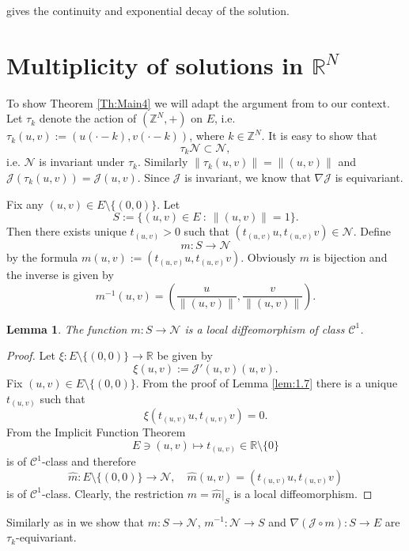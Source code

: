 \documentclass{scrartcl}
\newtheorem{Lem}[Th]{Lemma}
\newcommand{\cC}{{\mathcal C}}
\newcommand{\cJ}{{\mathcal J}}
\newcommand{\cN}{{\mathcal N}}
\newcommand{\R}{\mathbb{R}}
\numberwithin{equation}{section}
\begin{document}

\cite[Theorem 2]{PankovDecay} gives the continuity and exponential decay of the solution.

\section{Multiplicity of solutions in $\R^N$}\label{sect:6}

To show Theorem \ref{Th:Main4} we will adapt the argument from \cite{SzulkinWeth} to our context. Let $\tau_k$ denote the action of $(\mathbb{Z}^N, +)$ on $E$, i.e.
$\tau_k (u,v) := (u(\cdot -k), v(\cdot - k))$, where $k \in \mathbb{Z}^N$. It is easy to show that
$$
\tau_k \cN \subset \cN,
$$ 
i.e. $\cN$ is invariant under $\tau_k$. Similarly $\| \tau_k (u,v) \| = \| (u,v)\|$ and $\cJ(\tau_k (u,v)) = \cJ(u,v)$. Since $\cJ$ is invariant, we know that $\nabla \cJ$ is equivariant.

Fix any $(u,v) \in E \setminus\{(0,0)\}$. Let
$$
S := \{ (u,v) \in E \ : \ \| (u,v)\| = 1 \}.
$$
Then there exists unique $t_{(u,v)} > 0$ such that $(t_{(u,v)}u,t_{(u,v)}v) \in \cN$. Define
$$
m : S \rightarrow \cN
$$
by the formula $m(u,v) := (t_{(u,v)} u,t_{(u,v)} v)$. Obviously $m$ is bijection and the inverse is given by
$$
m^{-1} (u, v) = \left( \frac{u}{\|(u,v)\|}, \frac{v}{\|(u,v)\|} \right).
$$

\begin{Lem}
The function $m : S \rightarrow \cN$ is a local diffeomorphism of class $\cC^1$.
\end{Lem}

\begin{proof}
Let $\xi : E \setminus \{(0,0)\} \rightarrow \R$ be given by
$$
\xi(u,v) := \cJ'(u,v)(u,v).
$$
Fix $(u,v) \in E \setminus \{(0,0)\}$. From the proof of Lemma \ref{lem:1.7} there is a unique $t_{(u,v)}$ such that
$$
\xi\left( t_{(u,v)} u, t_{(u,v)} v \right) = 0.
$$
From the Implicit Function Theorem
$$
E \ni (u,v) \mapsto t_{(u,v)} \in \R \setminus \{0\}
$$
is of $\cC^1$-class and therefore
$$
\hat{m} : E \setminus \{ (0,0) \} \rightarrow \cN, \quad \hat{m}(u,v) = \left( t_{(u,v)} u, t_{(u,v)} v \right)
$$
is of $\cC^1$-class. Clearly, the restriction $m = \hat{m} \Big|_{S}$ is a local diffeomorphism.
\end{proof}

Similarly as in \cite[Lemma 5.6]{Bieganowski} we show that $m : S \rightarrow \cN$, $m^{-1} : \cN \rightarrow S$ and $\nabla (\cJ \circ m) :S \rightarrow E$ are $\tau_k$-equivariant.
\end{document}
